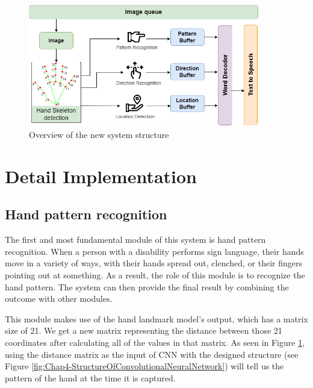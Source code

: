 \begin{figure}[H]
	\centering
	\includegraphics[width=0.9\textwidth]{img/Chap4/OverviewOfTheSystemModules-New.png}
	\caption{Overview of the new system structure}
	\label{fig:Chap4-OverviewOfTheSystemModules-New}
\end{figure}

\section{Detail Implementation}\label{sec:DetailImplementation}

\subsection{Hand pattern recognition}

The first and most fundamental module of this system is hand pattern recognition. When a person with a disability performs sign language, their hands move in a variety of ways, with their hands spread out, clenched, or their fingers pointing out at something. As a result, the role of this module is to recognize the hand pattern. The system can then provide the final result by combining the outcome with other modules.

This module makes use of the hand landmark model's output, which has a matrix size of 21. We get a new matrix representing the distance between those 21 coordinates after calculating all of the values in that matrix. As seen in Figure \ref{fig:Chap4-OverviewOfTheSystemModules-New}, using the distance matrix as the input of CNN with the designed structure (see Figure \ref{fig:Chap4-StructureOfConvolutionalNeuralNetwork}) will tell us the pattern of the hand at the time it is captured.

